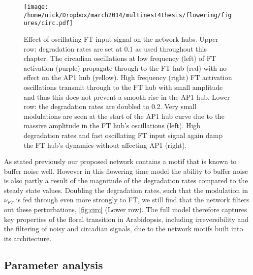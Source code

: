\begin{figure*}[!htbp]
\centering
\texttt{[image: /home/nick/Dropbox/march2014/multinest4thesis/flowering/figures/circ.pdf]}
\caption{Effect of oscillating FT input signal on the network hubs.
Upper row: degradation rates are set at 0.1 as used throughout this chapter.
The circadian oscillations at low frequency (left) of FT activation (purple) propagate through to the FT hub (red) with no effect on the AP1 hub (yellow).
High frequency (right) FT activation oscillations transmit through to the FT hub with small amplitude and thus this does not prevent a smooth rise in the AP1 hub.
Lower row: the degradation rates are doubled to 0.2.
Very small modulations are seen at the start of the AP1 hub curve due to the massive amplitude in the FT hub's oscillations (left).
High degradation rates and fast oscillating FT input signal again damp the FT hub's dynamics without affecting AP1 (right).
}
\label{fig:circ}
\end{figure*}

As stated previously our proposed network contains a motif that is known to buffer noise well.
However in this flowering time model the ability to buffer noise is also partly a result of the magnitude of the degradation rates compared to the steady state values.
Doubling the degradation rates, such that the modulation in $\nu_{FT}$ is fed through even more strongly to FT, we still find that the network filters out these perturbations, \autoref{fig:circ} (Lower row).
The full model therefore captures key properties of the floral transition in Arabidopsis, including irreversibility and the filtering of noisy and circadian signals, due to the network motifs built into its architecture.

\subsection{Parameter analysis}

